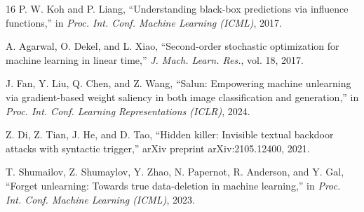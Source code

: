 \documentclass[conference]{IEEEtran}
\begin{document}
\begin{thebibliography}{16}
P. W. Koh and P. Liang, “Understanding black-box predictions via influence functions,” in \textit{Proc. Int. Conf. Machine Learning (ICML)}, 2017.

A. Agarwal, O. Dekel, and L. Xiao, “Second-order stochastic optimization for machine learning in linear time,” \textit{J. Mach. Learn. Res.}, vol. 18, 2017.

J. Fan, Y. Liu, Q. Chen, and Z. Wang, “Salun: Empowering machine unlearning via gradient-based weight saliency in both image classification and generation,” in \textit{Proc. Int. Conf. Learning Representations (ICLR)}, 2024.

Z. Di, Z. Tian, J. He, and D. Tao, “Hidden killer: Invisible textual backdoor attacks with syntactic trigger,” arXiv preprint arXiv:2105.12400, 2021.

T. Shumailov, Z. Shumaylov, Y. Zhao, N. Papernot, R. Anderson, and Y. Gal, “Forget unlearning: Towards true data-deletion in machine learning,” in \textit{Proc. Int. Conf. Machine Learning (ICML)}, 2023.

\end{thebibliography}
\end{document}
